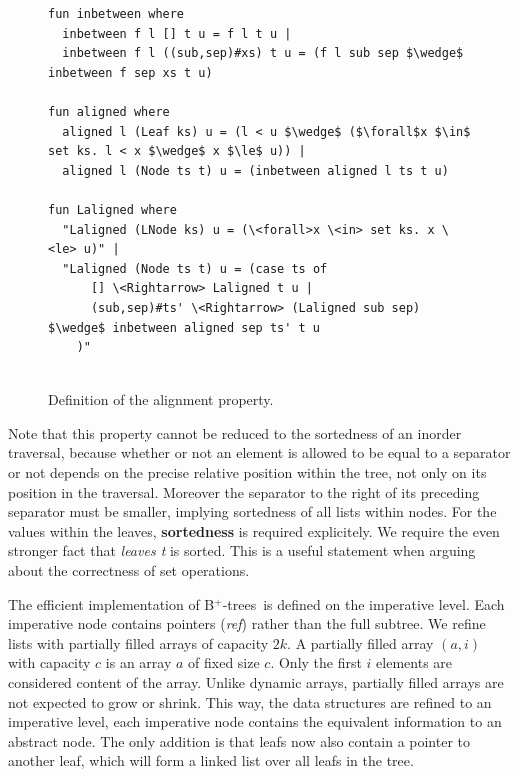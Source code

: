 \documentclass[a4paper,UKenglish,cleveref, autoref, thm-restate]{lipics-v2021}
\newcommand{\btrees}{B$^+$-trees}
\begin{document}
\begin{figure}
\begin{lstlisting}[mathescape=true, language=Isabelle,label=lst:btree-alignment-def]
fun inbetween where
  inbetween f l [] t u = f l t u |
  inbetween f l ((sub,sep)#xs) t u = (f l sub sep $\wedge$ inbetween f sep xs t u)

fun aligned where
  aligned l (Leaf ks) u = (l < u $\wedge$ ($\forall$x $\in$ set ks. l < x $\wedge$ x $\le$ u)) |
  aligned l (Node ts t) u = (inbetween aligned l ts t u)

fun Laligned where
  "Laligned (LNode ks) u = (\<forall>x \<in> set ks. x \<le> u)" |
  "Laligned (Node ts t) u = (case ts of
      [] \<Rightarrow> Laligned t u |
      (sub,sep)#ts' \<Rightarrow> (Laligned sub sep) $\wedge$ inbetween aligned sep ts' t u
    )"
  
\end{lstlisting}
\caption{Definition of the alignment property.}
\label{fig:btree-alignment-def}
\end{figure}


Note that this property cannot be reduced to the sortedness of an inorder traversal,
because whether or not an element is allowed to be equal to a separator or not
depends on the precise relative position within the tree, not only on its position in the traversal.
Moreover the separator to the right of its preceding separator must be smaller,
implying sortedness of all lists within nodes.
For the values within the leaves, \textbf{sortedness} is required explicitely.
We require the even stronger fact that \emph{leaves t} is sorted.
This is a useful statement when arguing about the correctness of set operations.

The efficient implementation of \btrees\ is defined
on the imperative level.
Each imperative node contains pointers (\emph{ref}) rather than the full subtree.
We refine lists with partially filled arrays of capacity $2k$.
A partially filled array $(a,i)$ with capacity $c$ is an array $a$ of fixed size $c$.
Only the first $i$ elements are considered content of the array.
Unlike dynamic arrays, partially filled arrays are not expected to grow or shrink.
This way, the data structures are refined to an imperative level,
each imperative node contains the equivalent information to an abstract node.
The only addition is that leafs now also contain a pointer to another leaf,
which will form a linked list over all leafs in the tree.
\end{document}
